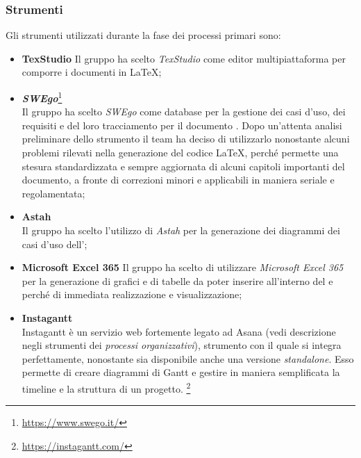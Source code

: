 \subsubsection{Strumenti}
Gli strumenti utilizzati durante la fase dei processi primari sono:
\begin{itemize}
	\item \textbf{TexStudio}
	\newline Il gruppo ha scelto \emph{TexStudio} come editor multipiattaforma per comporre i documenti in \LaTeX;
	\item \emph{\textbf{\emph{SWEgo}}}\footnote{\href{https://www.swego.it/}{https://www.swego.it/}}
	~\\ Il gruppo ha scelto \emph{SWEgo} come database per la gestione dei casi d'uso, dei requisiti e del loro tracciamento per il documento \AdR{}. Dopo un'attenta analisi preliminare dello strumento il team ha deciso di utilizzarlo nonostante alcuni problemi rilevati nella generazione del codice \LaTeX{}, perché permette una stesura standardizzata e sempre aggiornata di alcuni capitoli importanti del documento, a fronte di correzioni minori e applicabili in maniera seriale e regolamentata;
	\item \textbf{Astah}
	~\\Il gruppo ha scelto l'utilizzo di \emph{Astah} per la generazione dei diagrammi dei casi d'uso dell'\AdR{};
	\item \textbf{Microsoft Excel 365}
	\newline Il gruppo ha scelto di utilizzare \emph{Microsoft Excel 365} per la generazione di grafici e di tabelle da poter inserire all'interno del \PdQ{} e \PdP{} perché di immediata realizzazione e visualizzazione;
	
	\item \textbf{Instagantt}
	~\\Instagantt è un servizio web fortemente legato ad Asana (vedi descrizione negli strumenti dei \emph{processi organizzativi}), strumento con il quale si integra perfettamente, nonostante sia disponibile anche una versione \emph{standalone}. Esso permette di creare diagrammi di Gantt e gestire in maniera semplificata la timeline e la struttura di un progetto.
	\footnote{\href{https://instagantt.com/}{https://instagantt.com/}}
	
\end{itemize}	

